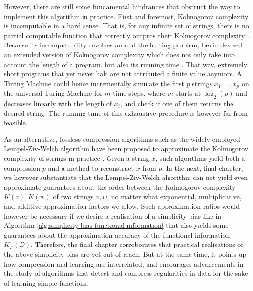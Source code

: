 However, there are still some fundamental hindrances that obstruct the way to implement this algorithm in practice. 
First and foremost, Kolmogorov complexity is incomputable in a hard sense.
That is, for any infinite set of strings, there is no partial computable function that correctly outputs their Kolmogorov complexity \cite{vitanyi2020incomputable}.
Because its incomputability revolves around the halting problem, Levin devised an extended version of Kolmogorov complexity which does not only take into account the length of a program, but also its running time \cite{levin1973universal}.
That way, extremely short programs that yet never halt are not attributed a finite value anymore.
A Turing Machine could hence incrementally simulate the first $p$ strings $x_1,\dots,x_p$ on the universal Turing Machine for $m$ time steps, where $m$ starts at $\log_2(p)$ and decreases linearly with the length of $x_i$, and check if one of them returns the desired string.
The running time of this exhaustive procedure is however far from feasible.

As an alternative, lossless compression algorithms such as the widely employed Lempel-Ziv-Welch algorithm \cite{welch1984technique} have been proposed to approximate the Kolmogorov complexity of strings in practice \cite[p.~696]{li2008kolmogorov}.
Given a string $x$, such algorithms yield both a compression $p$ and a method to reconstruct $x$ from $p$.
In the next, final chapter, we however substantiate that the Lempel-Ziv-Welch algorithm can not yield even approximate guarantees about the order between the Kolmogorov complexity $K(v),K(w)$ of two strings $v,w$, no matter what exponential, multiplicative, and additive approximation factors we allow.
Such approximation ratios would however be necessary if we desire a realisation of a simplicity bias like in Algorithm \ref{alg:simplicity-bias-functional-information} that also yields some guarantees about the approximation accuracy of the functional information $K_F(D)$.
Therefore, the final chapter corroborates that practical realisations of the above simplicity bias are yet out of reach. 
But at the same time, it points up how compression and learning are interrelated, and encourages advancements in the study of algorithms that detect and compress regularities in data for the sake of learning simple functions.



